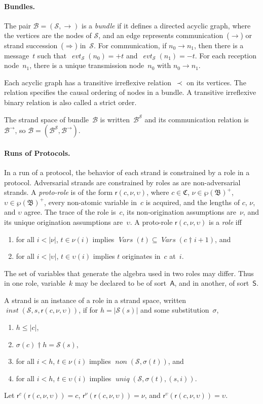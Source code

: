 \documentclass[12pt]{article}
\newcommand{\fn}[1]{\ensuremath{\operatorname{\mathit{#1}}}}
\newcommand{\srt}[1]{\ensuremath{\mathsf{#1}}}
\newcommand{\vars}{\fn{Vars}}
\newcommand{\prefix}[2]{#1\dagger#2}
\newcommand{\inbnd}{\mathord -}
\newcommand{\outbnd}{\mathord +}
\newcommand{\pow}[1]{\wp(#1)}
\newcommand{\alg}[1]{\ensuremath{\mathfrak{#1}}}
\newcommand{\atm}{\alg{B}}
\newcommand{\ssp}{\ensuremath{\mathcal{S}}}
\newcommand{\bun}{\ensuremath{\mathcal{B}}}
\newcommand{\tr}{\ensuremath{\mathfrak C}}
\newcommand{\evt}{\fn{evt}}
\newcommand{\role}{\mathsf{r}}
\begin{document}
\paragraph{Bundles.}
The pair $\bun=(\ssp,\to)$ is a \emph{bundle} if it defines a directed
acyclic graph, where the vertices are the nodes of $\ssp$, and an edge
represents communication~($\rightarrow$) or strand
succession~($\Rightarrow$) in~$\ssp$.  For communication, if
$n_0\rightarrow n_1$, then there is a message~$t$ such
that~$\evt_\ssp(n_0)=\outbnd t$ and~$\evt_\ssp(n_1)=\inbnd t$.  For
each reception node~$n_1$, there is a unique transmission node~$n_0$
with $n_0\rightarrow n_1$.

Each acyclic graph has a transitive irreflexive relation~$\prec$ on
its vertices.  The relation specifies the causal ordering of nodes in
a bundle.  A transitive irreflexive binary relation is also called a
strict order.

The strand space of bundle~{\bun} is written~$\bun^\ssp$ and its
communication relation is~$\bun^\to$, so
$\bun=(\bun^\ssp,\bun^\to)$.

\paragraph{Runs of Protocols.}
In a run of a protocol, the behavior of each strand is constrained by
a role in a protocol.  Adversarial strands are constrained by roles as
are non-adversarial strands.  A \emph{proto-role} is of the form
$\role(c,\nu,\upsilon)$, where $c\in\tr$, $\nu\in\pow{\atm}^+$,
$\upsilon\in\pow{\atm}^+$, every non-atomic variable in~$c$ is
acquired, and the lengths of $c$, $\nu$, and $\upsilon$ agree.  The
trace of the role is~$c$, its non-origination assumptions are~$\nu$,
and its unique origination assumptions are~$\upsilon$.  A proto-role
$\role(c,\nu,\upsilon)$ is a \emph{role} iff
\begin{enumerate}
\item for all $i<|\nu|$, $t\in \nu(i)$ implies
  $\vars(t)\subseteq\vars(\prefix{c}{i+1})$, and
\item for all $i<|\upsilon|$, $t\in \upsilon(i)$ implies
  $t$ originates in~$c$ at~$i$.
\end{enumerate}

The set of variables that generate the algebra used in two roles may
differ.  Thus in one role, variable~$k$ may be declared to be of
sort~\srt{A}, and in another, of sort~\srt{S}.

A strand is an instance of a role in a strand space, written
$\fn{inst}(\ssp,s,\role(c,\nu,\upsilon))$, if for $h=|\ssp(s)|$ and
some substitution~$\sigma$,
\begin{enumerate}
\item $h\leq|c|$,
\item $\prefix{\sigma(c)}{h}=\ssp(s)$,
\item for all $i<h$, $t\in \nu(i)$ implies $\fn{non}(\ssp,\sigma(t))$, and
\item for all $i<h$, $t\in \upsilon(i)$ implies
  $\fn{uniq}(\ssp,\sigma(t),(s,i))$.
\end{enumerate}
Let $\role^c(\role(c,\nu,\upsilon))=c$,
$\role^\nu(\role(c,\nu,\upsilon))=\nu$, and
$\role^\upsilon(\role(c,\nu,\upsilon))=\upsilon$.
\end{document}
